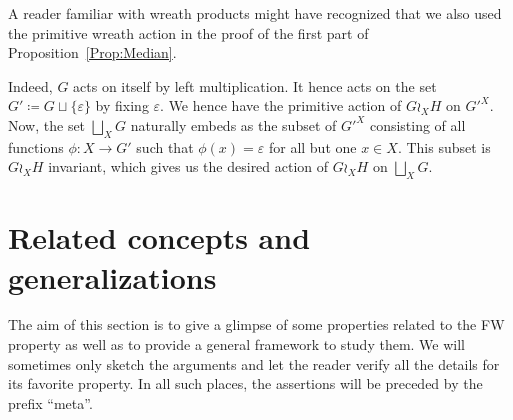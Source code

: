 \begin{rem}\label{Rem:Actions}
A reader familiar with wreath products might have recognized that we also used the primitive wreath action in the proof of the first part of Proposition~\ref{Prop:Median}.


Indeed, $G$ acts on itself by left multiplication.
It hence acts on the set $G'\coloneqq G\sqcup\{\varepsilon\}$ by fixing $\varepsilon$.
We hence have the primitive action of $G\wr_{X} H$ on $G'^X$.
Now, the set $\bigsqcup_XG$ naturally embeds as the subset of $G'^X$ consisting of all functions $\phi\colon X\to G'$ such that $\phi(x)=\varepsilon$ for all but one $x\in X$.
This subset is $G\wr_{X} H$ invariant, which gives us the desired action of $G\wr_{X} H$ on $\bigsqcup_XG$.
\end{rem}




\section{Related concepts and generalizations}\label{Section:Generalizations}

The aim of this section is to give a glimpse of some properties related to the FW property as well as to provide a general framework to study them.
We will sometimes only sketch the arguments and let the reader verify all the details for its favorite property.
In all such places, the assertions will be preceded by the prefix ``meta''.

